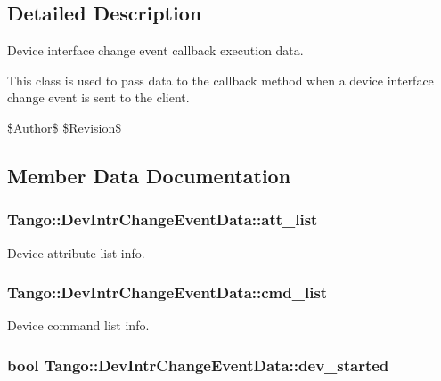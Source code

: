 \subsection{Detailed Description}
Device interface change event callback execution data. 

This class is used to pass data to the callback method when a device interface change event is sent to the client.

\$\-Author\$ \$\-Revision\$ 

\subsection{Member Data Documentation}
\subsubsection[{att\-\_\-list}]{ Tango\-::\-Dev\-Intr\-Change\-Event\-Data\-::att\-\_\-list}\label{classTango_1_1DevIntrChangeEventData_a89db4537a1e2634d03b6f3836469a5e0}


Device attribute list info. 

\subsubsection[{cmd\-\_\-list}]{ Tango\-::\-Dev\-Intr\-Change\-Event\-Data\-::cmd\-\_\-list}\label{classTango_1_1DevIntrChangeEventData_ab75f7e002dd7df09755b26e513231dc2}


Device command list info. 

\subsubsection[{dev\-\_\-started}]{\setlength{\rightskip}{0pt plus 5cm}bool Tango\-::\-Dev\-Intr\-Change\-Event\-Data\-::dev\-\_\-started}\label{classTango_1_1DevIntrChangeEventData_adbf8cb3b33018c236a5fa1440edb3588}


